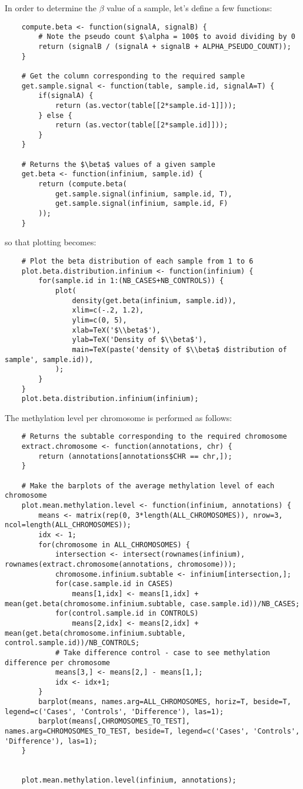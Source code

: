 \documentclass{article}
\begin{document}
In order to determine the $\beta$ value of a sample, let's define a few functions:
\begin{lstlisting}
	compute.beta <- function(signalA, signalB) {
		# Note the pseudo count $\alpha = 100$ to avoid dividing by 0
		return (signalB / (signalA + signalB + ALPHA_PSEUDO_COUNT));
	}

	# Get the column corresponding to the required sample
	get.sample.signal <- function(table, sample.id, signalA=T) {
		if(signalA) {
			return (as.vector(table[[2*sample.id-1]]));
		} else {
			return (as.vector(table[[2*sample.id]]));
		}
	}

	# Returns the $\beta$ values of a given sample
	get.beta <- function(infinium, sample.id) {
		return (compute.beta(
			get.sample.signal(infinium, sample.id, T),
			get.sample.signal(infinium, sample.id, F)
		));
	}
\end{lstlisting}

so that plotting becomes:
\begin{lstlisting}
	# Plot the beta distribution of each sample from 1 to 6
	plot.beta.distribution.infinium <- function(infinium) {
		for(sample.id in 1:(NB_CASES+NB_CONTROLS)) {
			plot(
				density(get.beta(infinium, sample.id)),
				xlim=c(-.2, 1.2),
				ylim=c(0, 5),
				xlab=TeX('$\\beta$'),
				ylab=TeX('Density of $\\beta$'),
				main=TeX(paste('density of $\\beta$ distribution of sample', sample.id)),
			);
		}
	}
	plot.beta.distribution.infinium(infinium);
\end{lstlisting}

The methylation level per chromosome is performed as follows:
\begin{lstlisting}
	# Returns the subtable corresponding to the required chromosome
	extract.chromosome <- function(annotations, chr) {
		return (annotations[annotations$CHR == chr,]);
	}

	# Make the barplots of the average methylation level of each chromosome
	plot.mean.methylation.level <- function(infinium, annotations) {
		means <- matrix(rep(0, 3*length(ALL_CHROMOSOMES)), nrow=3, ncol=length(ALL_CHROMOSOMES));
		idx <- 1;
		for(chromosome in ALL_CHROMOSOMES) {
			intersection <- intersect(rownames(infinium), rownames(extract.chromosome(annotations, chromosome)));
			chromosome.infinium.subtable <- infinium[intersection,];
			for(case.sample.id in CASES)
				means[1,idx] <- means[1,idx] + mean(get.beta(chromosome.infinium.subtable, case.sample.id))/NB_CASES;
			for(control.sample.id in CONTROLS)
				means[2,idx] <- means[2,idx] + mean(get.beta(chromosome.infinium.subtable, control.sample.id))/NB_CONTROLS;
			# Take difference control - case to see methylation difference per chromosome
			means[3,] <- means[2,] - means[1,];
			idx <- idx+1;
		}
		barplot(means, names.arg=ALL_CHROMOSOMES, horiz=T, beside=T, legend=c('Cases', 'Controls', 'Difference'), las=1);
		barplot(means[,CHROMOSOMES_TO_TEST], names.arg=CHROMOSOMES_TO_TEST, beside=T, legend=c('Cases', 'Controls', 'Difference'), las=1);
	}


	plot.mean.methylation.level(infinium, annotations);
\end{lstlisting}
\end{document}
